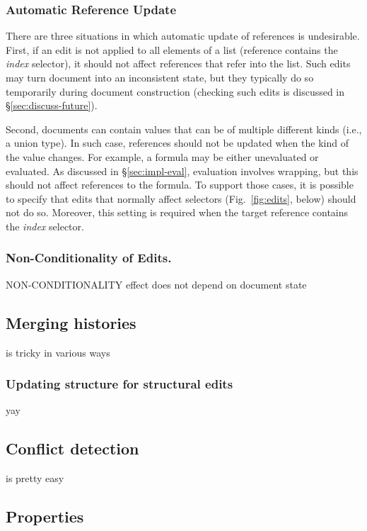 \documentclass[sigconf]{acmart}
\begin{document}

\subsubsection*{Automatic Reference Update}
There are three situations in which automatic update of references is undesirable. First, if
an edit is not applied to all elements of a list (reference contains the \emph{index} selector),
it should not affect references that refer into the list. Such edits may turn document into an
inconsistent state, but they typically do so temporarily during document construction
(checking such edits is discussed in \S\ref{sec:discuss-future}).

Second, documents can contain values that can be of multiple different kinds (i.e., a union type).
In such case, references should not be updated when the kind of the value changes. For example,
a formula may be either unevaluated or evaluated. As discussed in \S\ref{sec:impl-eval}, evaluation
involves wrapping, but this should not affect references to the formula.
To support those cases, it is possible to specify that edits that normally affect selectors
(Fig.~\ref{fig:edits}, below) should not do so. Moreover, this setting is required when the
target reference contains the \emph{index} selector.

\subsubsection*{Non-Conditionality of Edits.}
NON-CONDITIONALITY effect does not depend on document state

\subsection{Merging histories}
is tricky in various ways



\subsubsection*{Updating structure for structural edits}
yay

\subsection{Conflict detection}
is pretty easy

\subsection{Properties}
\end{document}
